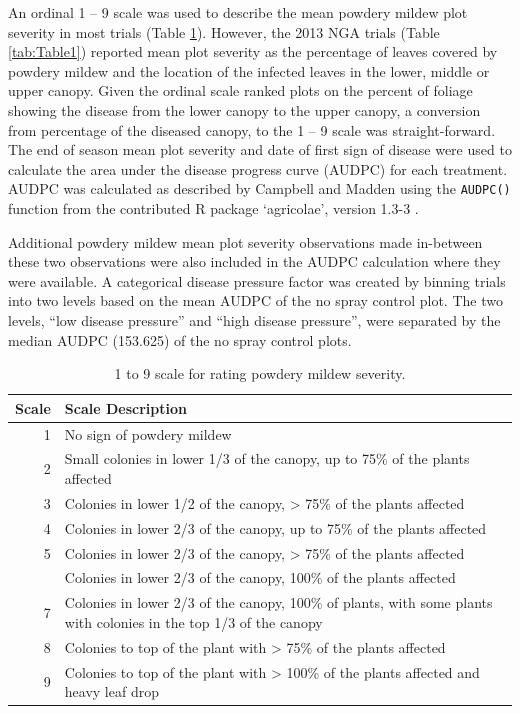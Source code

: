 \documentclass[agronomy,article,submit,moreauthors,pdftex]{mdpi}
\begin{document}
An ordinal 1 -- 9 scale was used to describe the mean powdery mildew plot severity in most trials (Table \ref{tab:Table2}).
However, the 2013 NGA trials (Table \ref{tab:Table1}) reported mean plot severity as the percentage of leaves covered by powdery mildew and the location of the infected leaves in the lower, middle or upper canopy.
Given the ordinal scale ranked plots on the percent of foliage showing the disease from the lower canopy to the upper canopy, a conversion from percentage of the diseased canopy, to the 1 -- 9 scale was straight-forward.
The end of season mean plot severity and date of first sign of disease were used to calculate the area under the disease progress curve (AUDPC) for each treatment.
AUDPC was calculated as described by Campbell and Madden \citep{Campbell1990} using the \texttt{AUDPC()} function from the contributed R package `agricolae', version 1.3-3 \citep{agricolae2020}.

Additional powdery mildew mean plot severity observations made in-between these two observations were also included in the AUDPC calculation where they were available.
A categorical disease pressure factor was created by binning trials into two levels based on the mean AUDPC of the no spray control plot.
The two levels, ``low disease pressure'' and ``high disease pressure'', were separated by the median AUDPC (153.625) of the no spray control plots.

\begin{table}

\caption{\label{tab:Table2}1 to 9 scale for rating powdery mildew severity.}
\centering
\begin{tabular}[t]{rl}
\toprule
Scale & Scale Description\\
\midrule
1 & No sign of powdery mildew\\
2 & Small colonies in lower 1/3 of the canopy, up to 75\% of the plants affected\\
3 & Colonies in lower 1/2 of the canopy, > 75\% of the plants affected\\
4 & Colonies in lower 2/3 of the canopy, up to 75\% of the plants affected\\
5 & Colonies in lower 2/3 of the canopy, > 75\% of the plants affected\\
\addlinespace
6 & Colonies in lower 2/3 of the canopy, 100\% of the plants affected\\
7 & Colonies in lower 2/3 of the canopy, 100\% of plants, with some plants with colonies in the top 1/3 of the canopy\\
8 & Colonies to top of the plant with > 75\% of the plants affected\\
9 & Colonies to top of the plant with > 100\% of the plants affected and heavy leaf drop\\
\bottomrule
\end{tabular}
\end{table}
\end{document}

